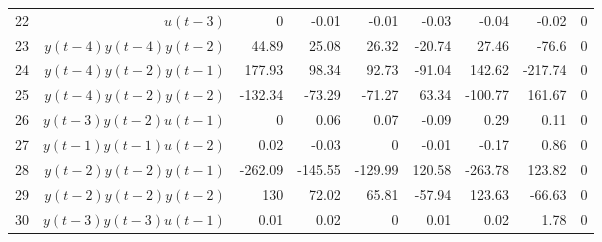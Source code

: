 \begin{tabular}{rrrrrrrrr}
22 & $u(t-3)$ & 0 & -0.01 & -0.01 & -0.03 & -0.04 & -0.02 & 0 \\ 
23 & $y(t-4)y(t-4)y(t-2)$ & 44.89 & 25.08 & 26.32 & -20.74 & 27.46 & -76.6 & 0 \\ 
24 & $y(t-4)y(t-2)y(t-1)$ & 177.93 & 98.34 & 92.73 & -91.04 & 142.62 & -217.74 & 0 \\ 
25 & $y(t-4)y(t-2)y(t-2)$ & -132.34 & -73.29 & -71.27 & 63.34 & -100.77 & 161.67 & 0 \\ 
26 & $y(t-3)y(t-2)u(t-1)$ & 0 & 0.06 & 0.07 & -0.09 & 0.29 & 0.11 & 0 \\ 
27 & $y(t-1)y(t-1)u(t-2)$ & 0.02 & -0.03 & 0 & -0.01 & -0.17 & 0.86 & 0 \\ 
28 & $y(t-2)y(t-2)y(t-1)$ & -262.09 & -145.55 & -129.99 & 120.58 & -263.78 & 123.82 & 0 \\ 
29 & $y(t-2)y(t-2)y(t-2)$ & 130 & 72.02 & 65.81 & -57.94 & 123.63 & -66.63 & 0 \\ 
30 & $y(t-3)y(t-3)u(t-1)$ & 0.01 & 0.02 & 0 & 0.01 & 0.02 & 1.78 & 0 \\ 
\hline 
\end{tabular}